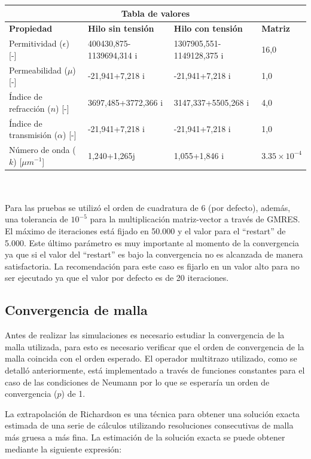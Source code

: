 \documentclass[12pt,letterpaper]{article}
\numberwithin{equation}{section}
\begin{document}
\hspace{-15mm}
\begin{tabular}{ |p{4.78cm}||p{4.6cm}|p{4.8cm}|p{3cm}|  }
	\hline
	\multicolumn{4}{|c|}{\textbf{Tabla de valores}} \\
	\hline
	\textbf{Propiedad} & \textbf{Hilo sin tensión} & \textbf{Hilo con tensión} & \textbf{Matriz}\\
	\hline
	Permitividad ($\epsilon$) [-]  & 400430,875-1139694,314 i   & 1307905,551-1149128,375 i & 16,0\\
	Permeabilidad ($\mu$) [-]&   -21,941+7,218 i  & -21,941+7,218 i & 1,0\\
	Índice de refracción ($n$) [-] & 3697,485+3772,366 i & 3147,337+5505,268 i & 4,0\\
	Índice de transmisión ($\alpha$) [-]   & -21,941+7,218 i & -21,941+7,218 i & 1,0\\
	Número de onda ($k$) [$\mu m^{-1}$] & 1,240+1,265j & 1,055+1,846 i &$3.35\times 10^{-4}$\\
	\hline
\end{tabular}
\\\\

Para las pruebas se utilizó el orden de cuadratura de 6 (por defecto), además, una tolerancia de $10^{-5}$ para la multiplicación matriz-vector a través de GMRES. El máximo de iteraciones está fijado en 50.000 y el valor para el ``restart'' de 5.000. Este último parámetro es muy importante al momento de la convergencia ya que si el valor del ``restart'' es bajo la convergencia no es alcanzada de manera satisfactoria. La recomendación para este caso es fijarlo en un valor alto para no ser ejecutado ya que el valor por defecto es de 20 iteraciones.

\pagebreak
\subsection{Convergencia de malla}

Antes de realizar las simulaciones es necesario estudiar la convergencia de la malla utilizada, para esto es necesario verificar que el orden de convergencia de la malla coincida con el orden esperado. El operador multitrazo utilizado, como se detalló anteriormente, está implementado a través de funciones constantes para el caso de las condiciones de Neumann por lo que se esperaría un orden de convergencia ($p$) de 1.

La extrapolación de Richardson es una técnica para obtener una solución exacta estimada de una serie de cálculos utilizando resoluciones consecutivas de malla más gruesa a más fina. La estimación de la solución exacta se puede obtener mediante la siguiente expresión:
\end{document}
